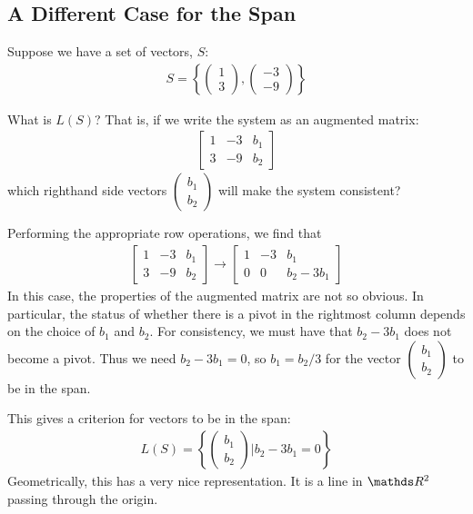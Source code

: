 \documentclass[11pt]{article}
\begin{document}
\subsection*{A Different Case for the Span}

Suppose we have a set of vectors, $S$:
\begin{align*}
S = \left\{ \begin{pmatrix}1\\3\end{pmatrix}, \begin{pmatrix}-3\\-9\end{pmatrix} \right\}
\end{align*}

What is $L(S)$? That is, if we write the system as an augmented matrix:
\begin{align*}
\left[
\begin{matrix}
1 & -3 & b_1
\\
3 & -9 & b_2
\end{matrix}
\right]
\end{align*}
which righthand side vectors $\begin{pmatrix}b_1\\b_2\end{pmatrix}$ will make the system consistent?

Performing the appropriate row operations, we find that
\begin{align*}
\left[
\begin{matrix}
1 & -3 & b_1
\\
3 & -9 & b_2
\end{matrix}
\right]
\longrightarrow
\left[
\begin{matrix}
1 & -3 & b_1
\\
0 & 0 & b_2 - 3 b_1
\end{matrix}
\right]
\end{align*}
In this case, the properties of the augmented matrix are not so obvious. In particular, the status of whether there is a pivot in the rightmost column depends on the choice of $b_1$ and $b_2$. For consistency, we must have that $b_2 - 3 b_1$ does not become a pivot. Thus we need $b_2 - 3b_1 = 0$, so $b_1 = b_2/3$ for the vector $\begin{pmatrix}b_1\\b_2\end{pmatrix}$ to be in the span.

This gives a criterion for vectors to be in the span:
\begin{align*}
L(S) = \left\{ \begin{pmatrix}b_1\\b_2\end{pmatrix} | b_2 - 3 b_1 = 0 \right\}
\end{align*}
Geometrically, this has a very nice representation. It is a line in $\bbR^2$ passing through the origin.
\end{document}
